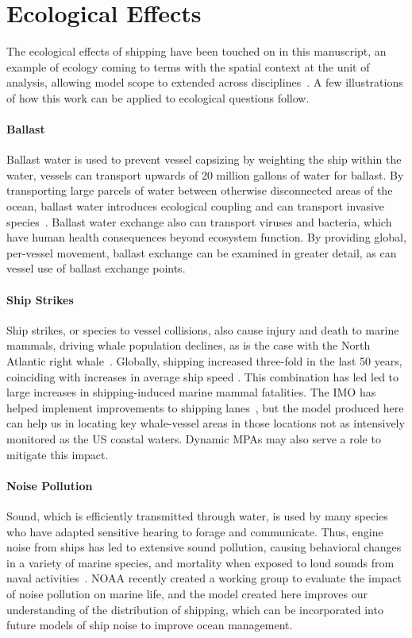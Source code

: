 \section{Ecological Effects}

The ecological effects of shipping have been touched on in this manuscript, an example of ecology coming to terms with the spatial context at the unit of analysis, allowing model scope to extended across disciplines~\citep{tilman1997}. A few illustrations of how this work can be applied to ecological questions follow.

\paragraph{Ballast} Ballast water is used to prevent vessel capsizing by weighting the ship within the water, vessels can transport upwards of 20 million gallons of water for ballast. By transporting large parcels of water between otherwise disconnected areas of the ocean, ballast water introduces ecological coupling and can transport invasive species~\citep{Ruiz2000,Keller2011}. Ballast water exchange also can transport viruses and bacteria, which have human health consequences beyond ecosystem function. By providing global, per-vessel movement, ballast exchange can be examined in greater detail, as can vessel use of ballast exchange points. 

\paragraph{Ship Strikes} Ship strikes, or species to vessel collisions, also cause injury and death to marine mammals, driving whale population declines, as is the case with the North Atlantic right whale~\citep{Moore2007}. Globally, shipping increased three-fold in the last 50 years, coinciding with increases in average ship speed \citep{Vanderlaan2009}. This combination has led led to large increases in shipping-induced marine mammal fatalities. The IMO has helped implement improvements to shipping lanes~\citep{Lagueux2011,Mckenna2012a}, but the model produced here can help us in locating key whale-vessel areas in those locations not as intensively monitored as the US coastal waters. Dynamic MPAs may also serve a role to mitigate this impact.

\paragraph{Noise Pollution} Sound, which is efficiently transmitted through water, is used by many species who have adapted sensitive hearing to forage and communicate. Thus, engine noise from ships has led to extensive sound pollution, causing behavioral changes in a variety of marine species, and mortality when exposed to loud sounds from naval activities~\citep{Hatch2009}. NOAA recently created a working group to evaluate the impact of noise pollution on marine life, and the model created here improves our understanding of the distribution of shipping, which can be incorporated into future models of ship noise to improve ocean management.

